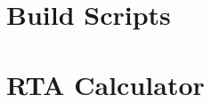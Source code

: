 \chapter{Build Scripts} %
\label{cha:build_scripts}


\chapter{RTA Calculator} %
\label{cha:rta_calculator}

